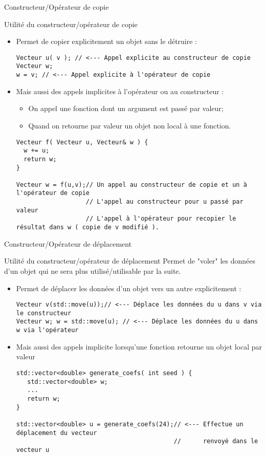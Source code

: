 \documentclass[handout,10pt]{beamer}
\begin{document}
\begin{frame}[fragile]{Constructeur/Opérateur de copie}

\begin{block}{Utilité du constructeur/opérateur de copie}
\begin{itemize}
\item Permet de copier explicitement un objet sans le détruire :
\begin{lstlisting}
Vecteur u( v ); // <--- Appel explicite au constructeur de copie
Vecteur w;
w = v; // <--- Appel explicite à l'opérateur de copie
\end{lstlisting}
\item Mais aussi des appels implicites à l'opérateur ou au constructeur :
\begin{itemize}
\item On appel une fonction dont un argument est passé par valeur;
\item Quand on retourne par valeur un objet non local à une fonction.
\end{itemize}
\begin{lstlisting}
Vecteur f( Vecteur u, Vecteur& w ) {
  w += u;
  return w;
}

Vecteur w = f(u,v);// Un appel au constructeur de copie et un à l'opérateur de copie
                   // L'appel au constructeur pour u passé par valeur
                   // L'appel à l'opérateur pour recopier le résultat dans w ( copie de v modifié ).
\end{lstlisting}
\end{itemize}
\end{block}
\end{frame}

\begin{frame}[fragile]{Constructeur/Opérateur de déplacement}
\begin{block}{Utilité du constructeur/opérateur de déplacement}
Permet de "voler" les données d'un objet qui ne sera plus utilisé/utilisable par la suite.
\begin{itemize}
\item Permet de déplacer les données d'un objet vers un autre explicitement :
\begin{lstlisting}
Vecteur v(std::move(u));// <--- Déplace les données du u dans v via le constructeur
Vecteur w; w = std::move(u); // <--- Déplace les données du u dans w via l'opérateur
\end{lstlisting}
\item Mais aussi des appels implicite lorsqu'une fonction retourne un objet local par valeur
\begin{lstlisting}
std::vector<double> generate_coefs( int seed ) {
   std::vector<double> w;
   ...
   return w;
}

std::vector<double> u = generate_coefs(24);// <--- Effectue un déplacement du vecteur 
                                           //      renvoyé dans le vecteur u
\end{lstlisting}
\end{itemize}
\end{block}
\end{frame}
\end{document}
